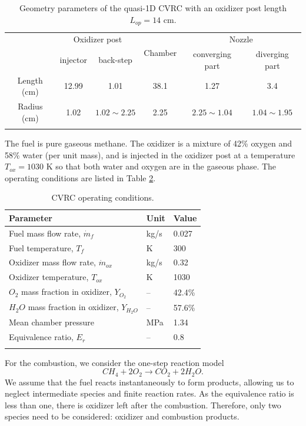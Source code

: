 \begin{table} [h]
	\centering
	\caption{Geometry parameters of the quasi-1D CVRC with an oxidizer post length $L_{op}=14$ cm.}
	\centering
	\begin{tabular}{c c c c c c }
		\toprule
		\centering
		\multirow{2}{*}{Section} &
		\multicolumn{2}{c}{Oxidizer post} &
		\multirow{2}{*}{Chamber} &
		\multicolumn{2}{c}{Nozzle} \\
		\cmidrule(lr){2-3} \cmidrule(lr){5-6}
		& injector & back-step & & converging part & diverging part\\
		\midrule
		Length (cm) & 12.99 & 1.01 & 38.1 & 1.27 & 3.4 \\
		Radius (cm) & 1.02  & $1.02 \sim 2.25$ & 2.25 & $2.25 \sim 1.04$ & $1.04 \sim 1.95$ \\
		\bottomrule
		\label{tab:geometry_parameters}
	\end{tabular} 
\end{table}
The fuel is pure gaseous methane. The oxidizer is a mixture of 42\% oxygen and 58\% water (per unit mass), and is injected in the oxidizer post at a temperature $T_{ox}=1030$ K so that both water and oxygen are in the gaseous phase. The operating conditions are listed in Table \ref{tab:operating-conditions}.

\begin{table} [h]
	\centering
	\caption{CVRC operating conditions.}
	\centering
	\begin{tabular}{l l l}
		\toprule
		\centering
		Parameter & Unit & Value \\
		\midrule
		Fuel mass flow rate, $\dot{m}_{f}$ & kg/s & 0.027   \\
		Fuel temperature, $T_{f}$ & K & 300   \\
		Oxidizer mass flow rate, $\dot{m}_{ox}$ & kg/s & 0.32   \\
		Oxidizer temperature, $T_{ox}$ & K & 1030   \\
		$O_2$ mass fraction in oxidizer, $Y_{O_2}$ & -- & 42.4\%   \\
		$H_2O$ mass fraction in oxidizer, $Y_{H_2O}$ & -- & 57.6\%   \\
		Mean chamber pressure & MPa & 1.34 \\
		Equivalence ratio, $E_r$ & -- & 0.8 \\
		\bottomrule
		\label{tab:operating-conditions}
	\end{tabular} 
\end{table}
For the combustion, we consider the one-step reaction model
\begin{equation*}\label{eq:combustion}
CH_4 + 2O_2 \rightarrow CO_2 + 2H_2O.
\end{equation*}
We assume that the fuel reacts instantaneously to form products, allowing us to neglect intermediate species and finite reaction rates. As the equivalence ratio is less than one, there is oxidizer left after the combustion. Therefore, only two species need to be considered: oxidizer and combustion products.


